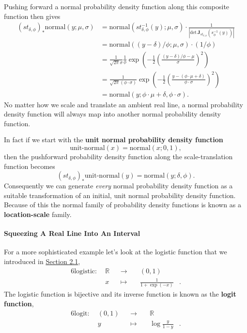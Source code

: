 \documentclass[
  letterpaper,
  DIV=11,
  numbers=noendperiod]{scrartcl}
\let\oldparagraph\paragraph
\renewcommand{\paragraph}[1]{\oldparagraph{#1}\mbox{}}
\begin{document}
Pushing forward a normal probability density function along this
composite function then gives \begin{align*}
(st_{\delta, \phi})_{*} \mathrm{normal}(y; \mu, \sigma)
&=
\mathrm{normal}(st_{\delta, \phi}^{-1}(y); \mu, \sigma)
\cdot
\frac{1}
{| \mathrm{det} \, \mathbf{J}_{st_{\delta, \phi}}(s_{\phi}^{-1}(y)) |}
\\
&=
\mathrm{normal}( (y - \delta) / \phi ; \mu, \sigma) \cdot (1 / \phi)
\\
&= \frac{1}{\sqrt{2 \pi} \sigma} \frac{1}{ \phi }
\exp \left(
-\frac{1}{2}
\left( \frac{ (y - \delta) / \phi - \mu}{\sigma} \right)^{2}
\right)
\\
&= \frac{1}{\sqrt{2 \pi} (\phi \cdot \sigma)}
\exp \left(
-\frac{1}{2}
\left(
\frac{ y - (\phi \cdot \mu + \delta)}{\phi \cdot \sigma}
\right)^{2}
\right)
\\
&=
\mathrm{normal}(y; \phi \cdot \mu + \delta, \phi \cdot \sigma).
\end{align*} No matter how we scale and translate an ambient real line,
a normal probability density function will always map into another
normal probability density function.

In fact if we start with the \textbf{unit normal probability density
function} \[
\text{unit-normal}(x) = \text{normal}(x; 0, 1),
\] then the pushforward probability density function along the
scale-translation function becomes \[
(st_{\delta, \phi})_{*} \text{unit-normal}(y)
=
\mathrm{normal}(y; \delta, \phi).
\] Consequently we can generate \emph{every} normal probability density
function as a suitable transformation of an initial, unit normal
probability density function. Because of this the normal family of
probability density functions is known as a \textbf{location-scale}
family.

\hypertarget{squeezing-a-real-line-into-an-interval}{%
\paragraph{Squeezing A Real Line Into An
Interval}\label{squeezing-a-real-line-into-an-interval}}

For a more sophisticated example let's look at the logistic function
that we introduced in \href{@sec:terminology}{Section 2.1},
\begin{alignat*}{6}
\text{logistic} :\; & \mathbb{R} & &\rightarrow& \; & (0, 1) &
\\
& x & &\mapsto& & \frac{1}{1 + \exp(-x)} &.
\end{alignat*} The logistic function is bijective and its inverse
function is known as the \textbf{logit function}, \begin{alignat*}{6}
\text{logit} :\; & (0, 1) & &\rightarrow& \; & \mathbb{R} &
\\
& y & &\mapsto& & \log \frac{y}{1 - y} &.
\end{alignat*}
\end{document}
